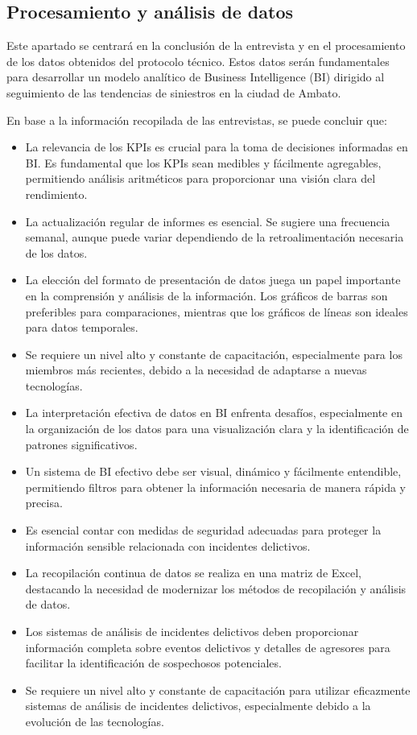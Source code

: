 \subsection{Procesamiento y análisis de datos}

Este apartado se centrará en la conclusión de la entrevista y en el procesamiento de
los datos obtenidos del protocolo técnico. Estos datos serán fundamentales para desarrollar
un modelo analítico de Business Intelligence (BI) dirigido al seguimiento de las tendencias de
siniestros en la ciudad de Ambato.
\bigbreak

En base a la información recopilada de las entrevistas, se puede concluir que:

\begin{itemize}
    \item La relevancia de los KPIs es crucial para la toma de decisiones informadas en BI. Es fundamental que los KPIs sean medibles y fácilmente agregables, permitiendo análisis aritméticos para proporcionar una visión clara del rendimiento.
    \item La actualización regular de informes es esencial. Se sugiere una frecuencia semanal, aunque puede variar dependiendo de la retroalimentación necesaria de los datos.
    \item La elección del formato de presentación de datos juega un papel importante en la comprensión y análisis de la información. Los gráficos de barras son preferibles para comparaciones, mientras que los gráficos de líneas son ideales para datos temporales.
    \item Se requiere un nivel alto y constante de capacitación, especialmente para los miembros más recientes, debido a la necesidad de adaptarse a nuevas tecnologías.
    \item La interpretación efectiva de datos en BI enfrenta desafíos, especialmente en la organización de los datos para una visualización clara y la identificación de patrones significativos.
    \item Un sistema de BI efectivo debe ser visual, dinámico y fácilmente entendible, permitiendo filtros para obtener la información necesaria de manera rápida y precisa.
    \item Es esencial contar con medidas de seguridad adecuadas para proteger la información sensible relacionada con incidentes delictivos.
    \item La recopilación continua de datos se realiza en una matriz de Excel, destacando la necesidad de modernizar los métodos de recopilación y análisis de datos.
    \item Los sistemas de análisis de incidentes delictivos deben proporcionar información completa sobre eventos delictivos y detalles de agresores para facilitar la identificación de sospechosos potenciales.
    \item Se requiere un nivel alto y constante de capacitación para utilizar eficazmente sistemas de análisis de incidentes delictivos, especialmente debido a la evolución de las tecnologías.
\end{itemize}

